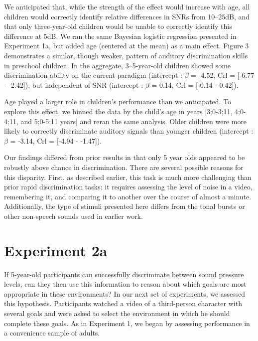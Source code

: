 \documentclass[10pt, letterpaper]{article}
\begin{document}
We anticipated that, while the strength of the effect would increase
with age, all children would correctly identify relative differences in
SNRs from 10--25dB, and that only three-year-old children would be
unable to correctly identify this difference at 5dB. We ran the same
Bayesian logistic regression presented in Experiment 1a, but added age
(centered at the mean) as a main effect. Figure 3 demonstrates a
similar, though weaker, pattern of auditory discrimination skills in
preschool children. In the aggregate, 3--5-year-old children showed some
discrimination ability on the current paradigm (intercept : \(\beta\) =
-4.52, Crl = {[}-6.77 - -2.42{]}), but independent of SNR (intercept :
\(\beta\) = 0.14, Crl = {[}-0.14 - 0.42{]}).

Age played a larger role in children's performance than we anticipated.
To explore this effect, we binned the data by the child's age in years
{[}3;0-3;11, 4;0-4;11, and 5;0-5;11 years{]} and reran the same
analysis. Older children were more likely to correctly discriminate
auditory signals than younger children (intercept : \(\beta\) = -3.14,
Crl = {[}-4.94 - -1.47{]}).

Our findings differed from prior results in that only 5 year olds
appeared to be robustly above chance in discrimination. There are
several possible reasons for this disparity. First, as described
earlier, this task is much more challenging than prior rapid
discrimination tasks: it requires assessing the level of noise in a
video, remembering it, and comparing it to another over the course of
almost a minute. Additionally, the type of stimuli presented here
differs from the tonal bursts or other non-speech sounds used in earlier
work.

\hypertarget{experiment-2a}{%
\section{Experiment 2a}\label{experiment-2a}}

If 5-year-old participants can successfully discriminate between sound
pressure levels, can they then use this information to reason about
which goals are most appropriate in these environments? In our next set
of experiments, we assessed this hypothesis. Participants watched a
video of a third-person character with several goals and were asked to
select the environment in which he should complete these goals. As in
Experiment 1, we began by assessing performance in a convenience sample
of adults.
\end{document}
